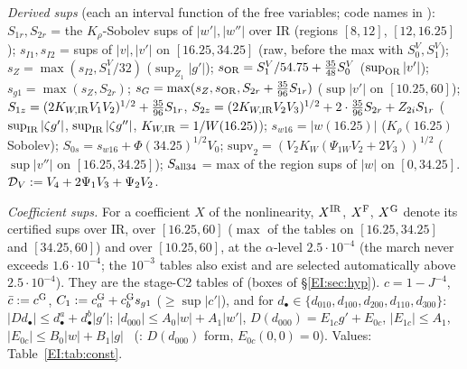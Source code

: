 \documentclass[11pt]{article}
\begin{document}
\noindent\emph{Derived sups} (each an interval function of the free variables; code names in ): $S_{1r},S_{2r}$ = the $K_\rho$-Sobolev sups of $|w'|,|w''|$ over IR (regions $[8,12]$, $[12,16.25]$); $s_{I1},s_{I2}$ = sups of $|v|,|v'|$ on $[16.25,34.25]$ (raw, before the max with $S^V_0,S^V_1$); $s_Z=\max(s_{I2},S^V_1/32)$ ($\sup_{Z_1}|g'|$); $s_{\rm OR}=S^V_1/54.75+\frac{35}{48}S^V_0$ ($\sup_{\mathrm{OR}}|v'|$); $s_{g1}=\max(s_Z,S_{2r})$; $s_G=\max(s_Z,s_{\rm OR},S_{2r}+\frac{35}{96}S_{1r})$ ($\sup|v'|$ on $[10.25,60]$); $S_{1z}=(2K_{W,\rm IR}V_1V_2)^{1/2}+\frac{35}{96}S_{1r}$, $S_{2z}=(2K_{W,\rm IR}V_2V_3)^{1/2}+2\cdot\frac{35}{96}S_{2r}+Z_{2i}S_{1r}$ ($\sup_{\rm IR}|\zeta g'|$, $\sup_{\rm IR}|\zeta g''|$, $K_{W,\rm IR}=1/W(16.25)$); $s_{w16}=|w(16.25)|$ ($K_\rho(16.25)$ Sobolev); $S_{0s}=s_{w16}+\Phi(34.25)^{1/2}V_0$; $\mathrm{supv}_2=(V_2K_W(\Psi_{1W}V_2+2V_3))^{1/2}$ ($\sup|v''|$ on $[16.25,34.25]$); $S_{\rm all34}$ = max of the region sups of $|w|$ on $[0,34.25]$. $\mathcal D_V:=V_4+2\Psi_1V_3+\Psi_2V_2$.

\noindent\emph{Coefficient sups.} For a coefficient $X$ of the nonlinearity, $X^{\rm IR}$, $X^{\rm F}$, $X^{\rm G}$ denote its certified sups over IR, over $[16.25,60]$ ($\max$ of the tables on $[16.25,34.25]$ and $[34.25,60]$) and over $[10.25,60]$, at the $\alpha$-level $2.5\cdot10^{-4}$ (the march never exceeds $1.6\cdot10^{-4}$; the $10^{-3}$ tables also exist and are selected automatically above $2.5\cdot10^{-4}$). They are the stage-C2 tables of  (boxes of \S\ref{EI:sec:hyp}). $c=1-J^{-4}$, $\bar c:=c^{\rm G}$, $C_1:=c_a^{\rm G}+c_b^{\rm G}s_{g1}$ ($\ge\sup|c'|$), and for $d_\bullet\in\{d_{010},d_{100},d_{200},d_{110},d_{300}\}$: $|Dd_\bullet|\le d_\bullet^a+d^b_\bullet|g'|$; $|d_{000}|\le A_0|w|+A_1|w'|$, $D(d_{000})=E_{1c}g'+E_{0c}$, $|E_{1c}|\le A_1$, $|E_{0c}|\le B_0|w|+B_1|g|$ \tS\ (: $D(d_{000})$ form, $E_{0c}(0,0)=0$). Values: Table~\ref{EI:tab:const}.
\end{document}
